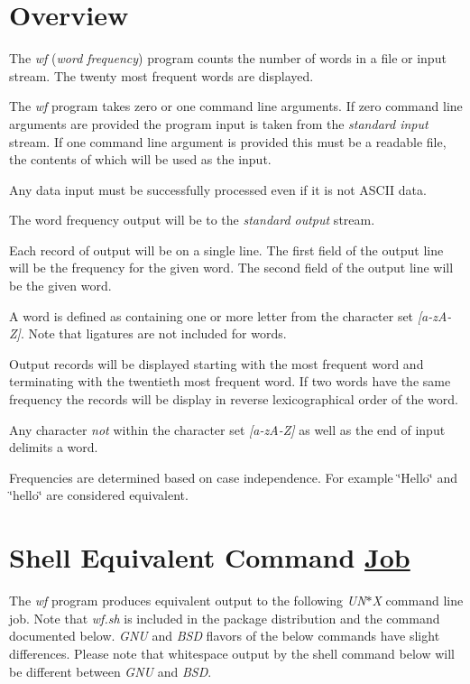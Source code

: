 \section*{Overview}


\begin{DoxyItemize}
\item The {\itshape wf} ({\itshape word frequency}) program counts the number of words in a file or input stream. The twenty most frequent words are displayed.
\item The {\itshape wf} program takes zero or one command line arguments. If zero command line arguments are provided the program input is taken from the {\itshape standard input} stream. If one command line argument is provided this must be a readable file, the contents of which will be used as the input.
\item Any data input must be successfully processed even if it is not A\+S\+C\+II data.
\item The word frequency output will be to the {\itshape standard output} stream.
\item Each record of output will be on a single line. The first field of the output line will be the frequency for the given word. The second field of the output line will be the given word.
\item A word is defined as containing one or more letter from the character set {\itshape \mbox{[}a-\/z\+A-\/Z\mbox{]}}. Note that ligatures are not included for words.
\item Output records will be displayed starting with the most frequent word and terminating with the twentieth most frequent word. If two words have the same frequency the records will be display in reverse lexicographical order of the word.
\item Any character {\itshape not} within the character set {\itshape \mbox{[}a-\/z\+A-\/Z\mbox{]}} as well as the end of input delimits a word.
\item Frequencies are determined based on case independence. For example \char`\"{}\+Hello\char`\"{} and \char`\"{}hello\char`\"{} are considered equivalent.
\end{DoxyItemize}

\section*{Shell Equivalent Command \mbox{\hyperlink{structJob}{Job}}}

The {\itshape wf} program produces equivalent output to the following {\itshape U\+N$\ast$X} command line job. Note that {\itshape wf.\+sh} is included in the package distribution and the command documented below. {\itshape G\+NU} and {\itshape B\+SD} flavors of the below commands have slight differences. Please note that whitespace output by the shell command below will be different between {\itshape G\+NU} and {\itshape B\+SD}. 




